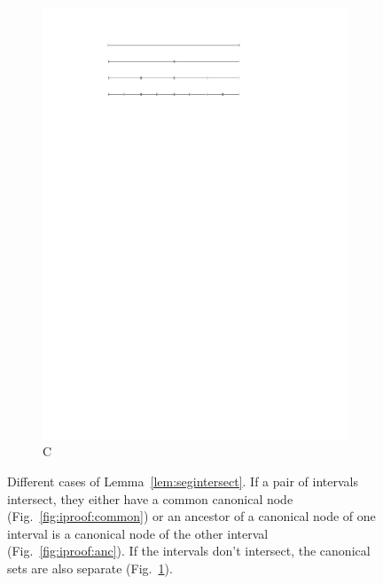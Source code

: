 \documentclass[english,gradu]{tktltiki2018}
\begin{document}
\begin{figure}
\begin{subfigure}[t]{0.32\textwidth}
		\includegraphics[width=\textwidth,page=2]{fig/iproof}
		\caption{C}\label{fig:iproof:no}
	\end{subfigure}
	\caption{Different cases of Lemma~\ref{lem:segintersect}.
	If a pair of intervals intersect, they either have a common canonical node (Fig.~\ref{fig:iproof:common}) or an ancestor of a canonical node of one interval is a canonical node of the other interval (Fig.~\ref{fig:iproof:anc}).
	If the intervals don't intersect, the canonical sets are also separate (Fig.~\ref{fig:iproof:no}).}\label{fig:iproof}
\end{figure}
\end{document}
